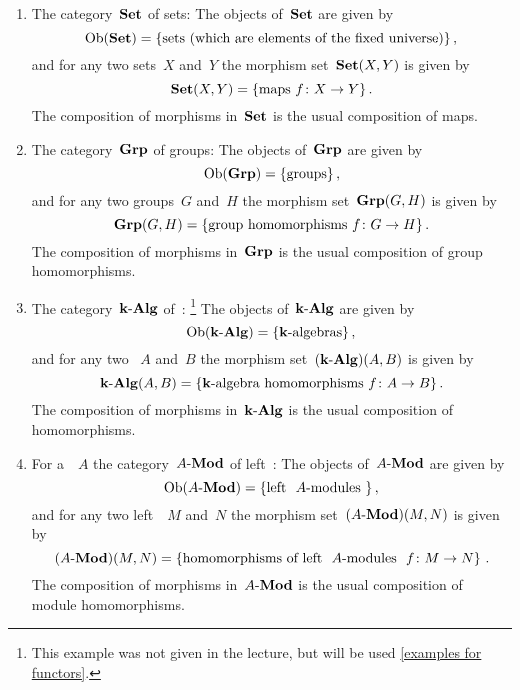 \begin{example}
  \leavevmode
  \begin{enumerate}
    \item
      The category~$\mathbf{Set}$ of sets:
      The objects of~$\mathbf{Set}$ are given by
      \[
          \operatorname{Ob}(\mathbf{Set})
        = \{
            \text{sets (which are elements of the fixed universe)}
          \} \,,
      \]
      and for any two sets~$X$ and~$Y$ the morphism set~$\mathbf{Set}(X,Y)$ is given by
      \[
          \mathbf{Set}(X,Y)
        = \{
            \text{maps~$f \colon X \to Y$}
          \} \,.
      \]
      The composition of morphisms in~$\mathbf{Set}$ is the usual composition of maps.
    \item
      The category~$\mathbf{Grp}$ of groups:
      The objects of~$\mathbf{Grp}$ are given by
      \[
          \operatorname{Ob}(\mathbf{Grp})
        = \{
            \text{groups}
          \} \,,
      \]
      and for any two groups~$G$ and~$H$ the morphism set~$\mathbf{Grp}(G,H)$ is given by
      \[
          \mathbf{Grp}(G,H)
        = \{
            \text{group homomorphisms~$f \colon G \to H$}
          \} \,.
      \]
      The composition of morphisms in~$\mathbf{Grp}$ is the usual composition of group homomorphisms.
    \item
      The category~$\text{$\mathbf{k}$-$\mathbf{Alg}$}$ of~{\kalgs}:%
      \footnote{This example was not given in the lecture, but will be used \cref{examples for functors}.}
      The objects of~$\text{$\mathbf{k}$-$\mathbf{Alg}$}$ are given by
      \[
          \Ob(\kAlg)
        = \{
            \text{{\kalgs}}
          \} \,,
      \]
      and for any two {\kalgs}~$A$ and~$B$ the morphism set~$(\text{$\mathbf{k}$-$\mathbf{Alg}$})(A,B)$ is given by
      \[
          \kAlg(A,B)
        = \{
            \text{{\kalg} homomorphisms~$f \colon A \to B$}
          \} \,.
      \]
      The composition of morphisms in~$\text{$\mathbf{k}$-$\mathbf{Alg}$}$ is the usual composition of~{\kalg} homomorphisms.
    \item
      For a~{\kalg}~$A$ the category~$\text{$A$-$\mathbf{Mod}$}$ of left~{}:
      The objects of~$\text{$A$-$\mathbf{Mod}$}$ are given by
      \[
          \Ob(\Modl{A})
        = \{
            \text{left~{\modules{$A$}}}
          \} \,,
      \]
      and for any two left~{}~$M$ and~$N$ the morphism set~$(\text{$A$-$\mathbf{Mod}$})(M,N)$ is given by
      \[
          (\Modl{A})(M,N)
        = \left\{
            \text{homomorphisms of left~{\modules{$A$}}~$f \colon M \to N$}
          \right\} \,.
      \]
      The composition of morphisms in~$\text{$A$-$\mathbf{Mod}$}$ is the usual composition of module homomorphisms.
      

\end{enumerate}
\end{example}
